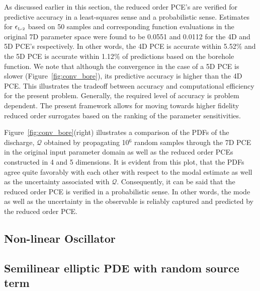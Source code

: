 As discussed earlier in this section, the reduced order PCE's are verified for
predictive accuracy in a least-squares sense and a probabilistic sense.
Estimates for $\epsilon_{\mbox{\tiny{L-2}}}$ based on 50 samples and
corresponding function evaluations in the original 7D parameter space were
found to be 0.0551 and 0.0112 for the 4D and 5D PCE's respectively. In other
words, the 4D PCE is accurate within 5.52$\%$ and the 5D PCE is accurate within
1.12$\%$ of predictions based on the borehole function. We note  that although
the convergence in the case of a 5D PCE is slower (Figure~\ref{fig:conv_bore}),
its predictive accuracy is higher than the 4D PCE. This illustrates the
tradeoff between accuracy and computational efficiency for the present 
problem. Generally, the required level of accuracy is problem dependent. 
The present framework allows for moving towards higher fidelity 
reduced order surrogates based on the ranking of the parameter sensitivities. 
 


Figure~\ref{fig:conv_bore}(right) illustrates a comparison of the PDFs
of the
discharge, $\mathcal{Q}$ obtained by propagating 10$^6$ random
samples through the 7D PCE in the original input parameter domain as well as
the reduced order PCEs constructed in 4 and 5 dimensions. 
It is evident from this plot, that the PDFs agree quite favorably with each
other with respect to the modal estimate as well as the uncertainty associated with 
$\mathcal{Q}$. 
Consequently, it can be said that the reduced order PCE is verified in a
probabilistic sense. In other words, the mode as well as the uncertainty in the
observable is reliably captured and predicted by the reduced order PCE. 
 
\subsection{Non-linear Oscillator}

\subsection{Semilinear elliptic PDE with random source term}

